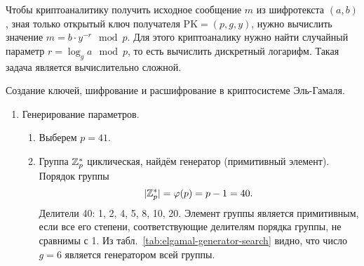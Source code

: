 Чтобы криптоаналитику получить исходное сообщение $m$ из шифротекста $(a, b)$, зная только открытый ключ получателя $\text{PK} = (p, g, y)$, нужно вычислить значение $m = b \cdot y^{-r} \mod p$. Для этого криптоаналику нужно найти случайный параметр $r = \log_g a \mod p$, то есть вычислить дискретный логарифм. Такая задача является вычислительно сложной.

\example Создание ключей, шифрование и расшифрование в криптосистеме Эль-Гамаля.

\begin{enumerate}
    \item Генерирование параметров.
        \begin{enumerate}
            \item Выберем $p=41$.
            \item Группа $\mathbb{Z}_p^*$ циклическая, найдём генератор (примитивный элемент). Порядок группы
                \[ |\mathbb{Z}_p^*| = \varphi(p) = p-1 = 40. \]
                Делители 40: 1, 2, 4, 5, 8, 10, 20. Элемент группы является примитивным, если все его степени, соответствующие делителям порядка группы, не сравнимы с 1. Из табл.~\ref{tab:elgamal-generator-search} видно, что число $g = 6$ является генератором всей группы.
                \begin{table}[!ht]
                    \centering
                    \caption{Поиск генератора в циклической группе $\Z_{41}^*$. Элемент 6 -- генератор\label{tab:elgamal-generator-search}}
                \end{table}

\end{enumerate}
\end{enumerate}
